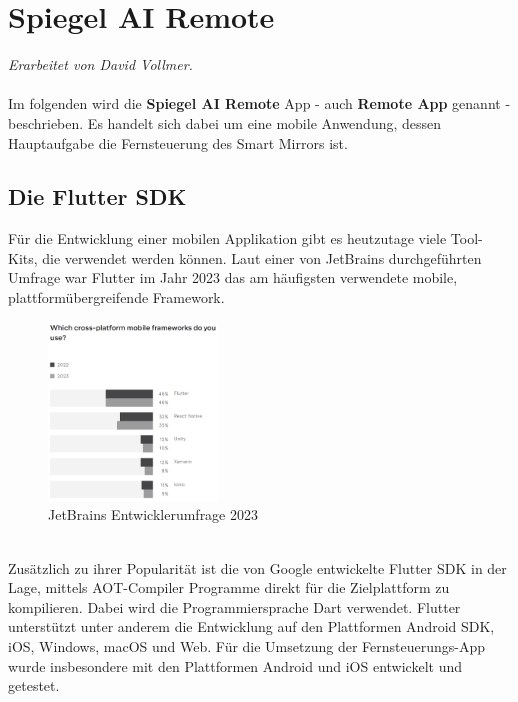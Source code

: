 \chapter{Spiegel AI Remote}
\textit{Erarbeitet von David Vollmer.} \\ \\
Im folgenden wird die \textbf{Spiegel AI Remote} App - auch \textbf{Remote App} genannt - beschrieben. Es handelt sich dabei um eine mobile Anwendung, dessen Hauptaufgabe die Fernsteuerung des Smart Mirrors ist.

\section{Die Flutter\texttrademark{} SDK}
Für die Entwicklung einer mobilen Applikation gibt es heutzutage viele Tool-Kits, die verwendet werden können. Laut einer von JetBrains durchgeführten Umfrage war Flutter im Jahr 2023 das am häufigsten verwendete mobile, plattformübergreifende Framework.
\begin{figure}[h]
    \centering
    \includegraphics[width=0.4\textwidth]{pictures/frameworks_stats.png}
    \captionsetup{justification=centering, labelformat=simple, singlelinecheck=false}
    \caption{JetBrains Entwicklerumfrage 2023 \cite{jetbrains_survey}}
    \label{fig:jetbrains_survey}
\end{figure} \\
Zusätzlich zu ihrer Popularität ist die von Google entwickelte Flutter SDK in der Lage, mittels AOT-Compiler Programme direkt für die Zielplattform zu kompilieren. Dabei wird die Programmiersprache Dart verwendet.\cite{dart_platform} Flutter unterstützt unter anderem die Entwicklung auf den Plattformen Android SDK, iOS, Windows, macOS und Web.\cite{flutter_supported_platforms} Für die Umsetzung der Fernsteuerungs-App wurde insbesondere mit den Plattformen Android und iOS entwickelt und getestet.

